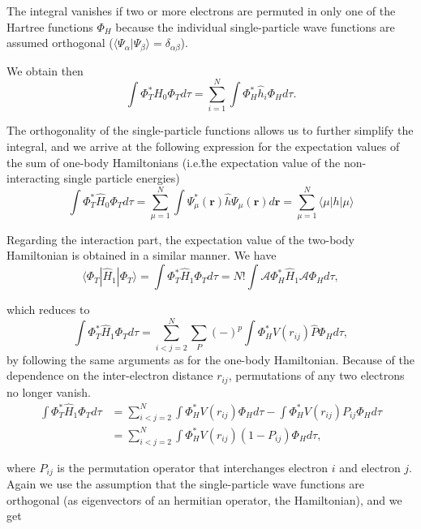 The integral vanishes if two or more electrons are permuted in only one of the Hartree functions $\Phi_H$ because the individual single-particle wave functions are assumed orthogonal ($\langle \Psi_\alpha | \Psi_\beta \rangle = \delta_{\alpha \beta}$).

We obtain then
\begin{equation}
\nonumber
\int \Phi_T^* \hat{H}_0 \Phi_T d\tau = \sum_{i=1}^N  \int \Phi_H^*\hat{h}_i \Phi_H d\tau.
\end{equation}

The orthogonality of the single-particle functions allows us to further simplify the integral, and we arrive at the following expression for the expectation values of the sum of one-body Hamiltonians (i.e.\~the expectation value of the non-interacting single particle energies)
\begin{equation}
\label{eq:nonInteracH}
\int \Phi_T^* \hat{H}_0 \Phi_T d\tau = \sum_{\mu=1}^N  \int \Psi_\mu^*(\mathbf{r}) \hat{h} \Psi_\mu(\mathbf{r}) d\mathbf{r}
= \sum_{\mu=1}^N \langle \mu |h| \mu \rangle
\end{equation}

Regarding the interaction part, the expectation value of the two-body Hamiltonian is obtained in a similar manner. We have
\begin{equation}
\nonumber
\langle \Phi_T | \hat{H}_1 | \Phi_T  \rangle= \int \Phi_T^*\hat{H}_1 \Phi_T d\tau = N! \int \mathcal{A} \Phi_H^*\hat{H}_1 \mathcal{A} \Phi_H d\tau,
\end{equation}

which reduces to
\begin{equation}
\nonumber
\int \Phi_T^*\hat{H}_1 \Phi_T d\tau = \sum_{i<j=2}^N \sum_P (-)^p  \int \Phi_H^* V(r_{ij}) \hat{P} \Phi_H d\tau,
\end{equation}
by following the same arguments as for the one-body Hamiltonian. Because of the dependence on the inter-electron distance $r_{ij}$, permutations of any two electrons no longer vanish.
\begin{align}
\nonumber
\int \Phi_T^*\hat{H}_1 \Phi_T d\tau &=  \sum_{i<j=2}^N \int \Phi_H^* V(r_{ij}) \Phi_H d\tau - \int \Phi_H^* V(r_{ij}) P_{ij} \Phi_H d\tau \\
\nonumber
&=  \sum_{i<j=2}^N \int \Phi_H^* V(r_{ij}) (1-P_{ij}) \Phi_H d\tau,
\end{align}

where $P_{ij}$ is the permutation operator that interchanges electron $i$ and electron $j$. Again we use the assumption that the single-particle wave functions are orthogonal (as eigenvectors of an hermitian operator, the Hamiltonian), and we get

